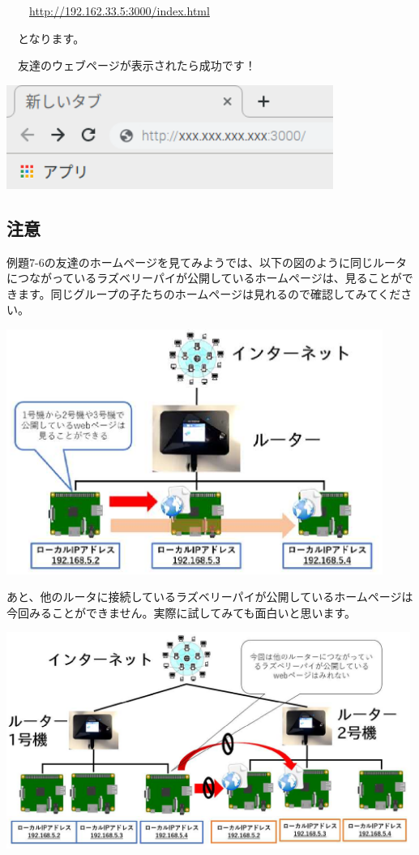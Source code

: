 \documentclass[a4paper,12pt,dvipdfmx]{jarticle}
\begin{document}
\ \ 　\url{http://192.162.33.5:3000/index.html}

\ \ となります。

\ \ 友達のウェブページが表示されたら成功です！


\bigskip


\centering
\includegraphics[width=10.659cm]{ome7-img043.png}
\flushleft

\clearpage\subsection*{\bfseries
	注意}

例題7-6の友達のホームページを見てみようでは、以下の図のように同じルータにつながっているラズベリーパイが公開しているホームページは、見ることができます。同じグループの子たちのホームページは見れるので確認してみてください。

\centering
\includegraphics[width=12.284cm]{ome7-img044}
\flushleft


\bigskip


\bigskip



あと、他のルータに接続しているラズベリーパイが公開しているホームページは今回みることができません。実際に試してみても面白いと思います。


\bigskip

\centering
\includegraphics[width=13.166cm]{ome7-img045}
\flushleft
\end{document}
